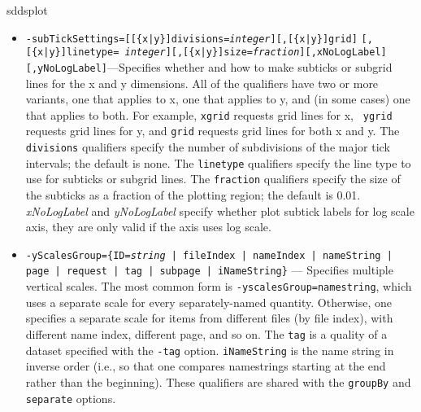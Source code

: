\begin{sddsprog}{sddsplot}
\begin{itemize}
\begin{itemize}
The {\tt factor} qualifiers specify factors to apply to the data values in producing the labels.  For example, one
might want to muliply small values by a power of ten in order to get labels that are of order units.  The {\tt
spacing} values give the spacing of the ticks and labels with any factor included.  I.e., to keep the same number
of ticks, {\tt factor} and {\tt spacing} values must be increased together.  Usually, giving the {\tt spacing}
qualifiers is unnecessary, since \verb|sddsplot| chooses appropriate values.

The {\tt modulus} qualifiers allow printing the modulus of the label value rather than the value itself; for
example, one might use {\tt xmodulus=24} if x was the time in hours over many days.  The {\tt size} qualifiers
permit specification of the size of the ticks as a fraction of the range in the opposing dimension; the default is
0.02.  The {\em linetype} qualifiers specify the linetype to be used for ticks and grid lines, using integer values
as for the {\tt -graph=line} switch.  The {\tt logarithmic} qualifiers specify log-style ticks and labels; the
implication is that the data being plotted is the base-ten logarithm of something.

  \item {\tt -subTickSettings=[[\{x|y\}]divisions={\em integer}][,[\{x|y\}]grid]} {\tt [,[\{x|y\}]linetype={\em
integer}][,[\{x|y\}]size={\em fraction}][,xNoLogLabel][,yNoLogLabel]}---Specifies whether and how to make subticks or subgrid lines for the
x and y dimensions.  All of the qualifiers have two or more variants, one that applies to x, one that applies
to y, and (in some cases) one that applies to both.  For example, {\tt xgrid} requests grid lines for x, {\tt
ygrid} requests grid lines for y, and {\tt grid} requests grid lines for both x and y.  The {\tt divisions}
qualifiers specify the number of subdivisions of the major tick intervals; the default is none.  The {\tt linetype}
qualifiers specify the line type to use for subticks or subgrid lines.  The {\tt fraction} qualifiers specify
the size of the subticks as a fraction of the plotting region; the default is 0.01. {\em xNoLogLabel} and {\em yNoLogLabel} specify whether plot subtick labels for log scale axis, they are only valid if the axis uses log scale.

  \item {\tt -yScalesGroup=\{ID={\em string} | fileIndex | nameIndex | nameString | page | request | tag | subpage | iNameString\}} --- 
        Specifies multiple vertical scales.  The most common form is {\tt -yscalesGroup=namestring}, which
        uses a separate scale for every separately-named quantity.  Otherwise, one specifies a separate
        scale for items from different files (by file index), with different name index, different page,
        and so on.  The \verb|tag| is a quality of a dataset specified with the \verb|-tag| option.
        \verb|iNameString| is the name string in inverse order (i.e., so that one compares namestrings
        starting at the end rather than the beginning).  These qualifiers are shared with the
        \verb|groupBy| and \verb|separate| options.
        

\end{itemize}
\end{itemize}
\end{sddsprog}
